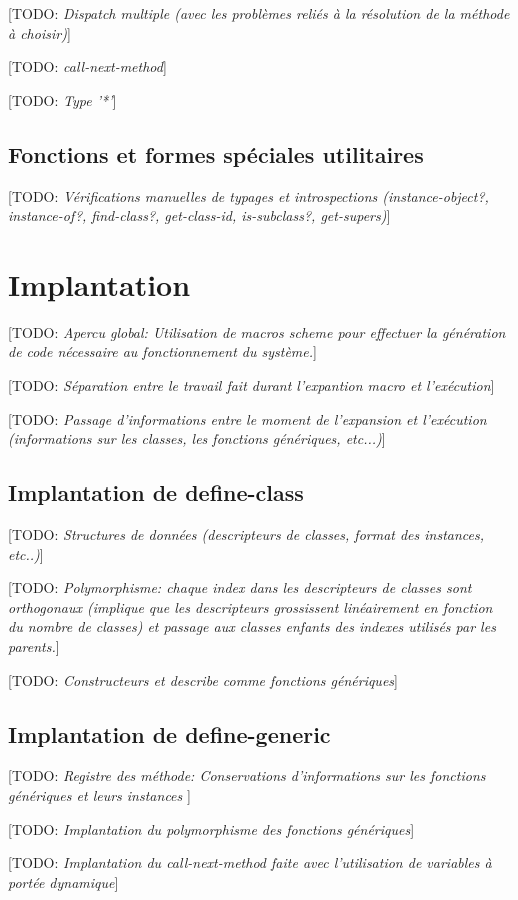 \documentclass[12pt,oneside,letterpaper,francais]{book}
\newcommand{\todo}[1]{[TODO: {\it #1}]}
\begin{document}
\todo{Dispatch multiple (avec les problèmes reliés à la résolution de la méthode à choisir)}

\todo{call-next-method}

\todo{Type '*'}

\subsection{Fonctions et formes spéciales utilitaires}

\todo{Vérifications manuelles de typages et introspections
  (instance-object?, instance-of?, find-class?, get-class-id,
  is-subclass?, get-supers)}




\section{Implantation}
\todo{Apercu global: Utilisation de macros scheme pour effectuer la
  génération de code nécessaire au fonctionnement du système.}

\todo{Séparation entre le travail fait durant l'expantion macro et
  l'exécution}

\todo{Passage d'informations entre le moment de l'expansion et
  l'exécution (informations sur les classes, les fonctions génériques,
  etc...)}

\subsection{Implantation de define-class}
\todo{Structures de données (descripteurs de classes, format des
  instances, etc..)}

\todo{Polymorphisme: chaque index dans les descripteurs de classes
  sont orthogonaux (implique que les descripteurs grossissent
  linéairement en fonction du nombre de classes) et passage aux
  classes enfants des indexes utilisés par les parents.}

\todo{Constructeurs et describe comme fonctions génériques}

\subsection{Implantation de define-generic}
\todo{Registre des méthode: Conservations d'informations sur les
  fonctions génériques et leurs instances }

\todo{Implantation du polymorphisme des fonctions génériques}

\todo{Implantation du call-next-method faite avec l'utilisation de
  variables à portée dynamique}
\end{document}

